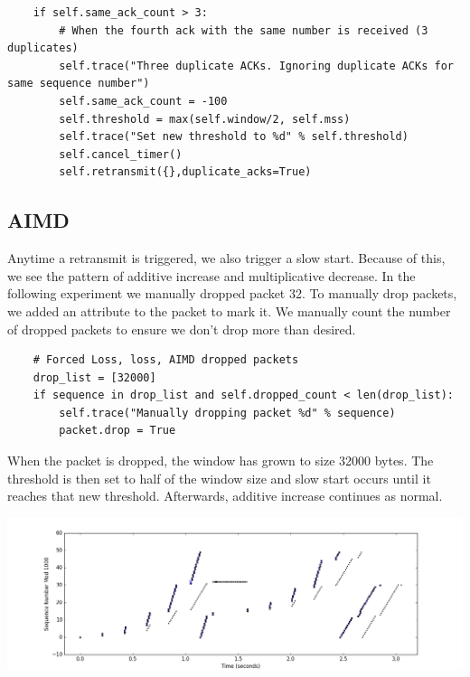 \documentclass[11pt]{article}
\begin{document}
\vspace{5mm}

\begin{lstlisting}
    if self.same_ack_count > 3:
        # When the fourth ack with the same number is received (3 duplicates)
        self.trace("Three duplicate ACKs. Ignoring duplicate ACKs for same sequence number")
        self.same_ack_count = -100
        self.threshold = max(self.window/2, self.mss)
        self.trace("Set new threshold to %d" % self.threshold)
        self.cancel_timer()
        self.retransmit({},duplicate_acks=True)
\end{lstlisting}

\vspace{5mm}

\subsection{AIMD}

Anytime a retransmit is triggered, we also trigger a slow start. Because of this, we see the pattern of additive increase and multiplicative decrease. In the following experiment we manually dropped packet 32. To manually drop packets, we added an attribute to the packet to mark it. We manually count the number of dropped packets to ensure we don't drop more than desired.

\vspace{5mm}

\begin{lstlisting}
    # Forced Loss, loss, AIMD dropped packets
    drop_list = [32000]
    if sequence in drop_list and self.dropped_count < len(drop_list):
        self.trace("Manually dropping packet %d" % sequence)
        packet.drop = True
\end{lstlisting}

\vspace{5mm}

When the packet is dropped, the window has grown to size 32000 bytes. The threshold is then set to half of the window size and slow start occurs until it reaches that new threshold. Afterwards, additive increase continues as normal.

\vspace{5mm}

\includegraphics[width=17cm]{charts/aimd.png}
\end{document}
